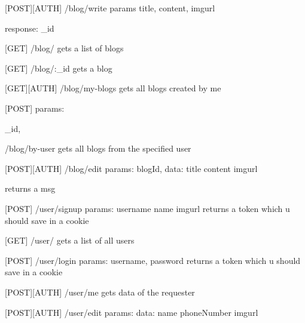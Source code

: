 [POST][AUTH] /blog/write
params{
	title,
content,
imgurl
}

response: _id

[GET]
/blog/
gets a list of blogs

[GET]
/blog/:_id
gets a blog

[GET][AUTH]
/blog/my-blogs
gets all blogs created by me 



[POST]
params: {
	_id,

}
/blog/by-user
gets all blogs from the specified user

[POST][AUTH]
/blog/edit
params: {
	blogId,
	data: {
	title
content
imgurl
}
}

returns a msg

[POST]
/user/signup
params: {
username
name
imgurl
}
returns a token which u should save in a cookie

[GET]
/user/
gets a list of all users

[POST]
/user/login
params: {
	username,
password
}
returns a token which u should save in a cookie

[POST][AUTH]
/user/me
gets data of the requester

[POST][AUTH]
/user/edit
params: {
	data: {
	name
phoneNumber
imgurl
}
}

